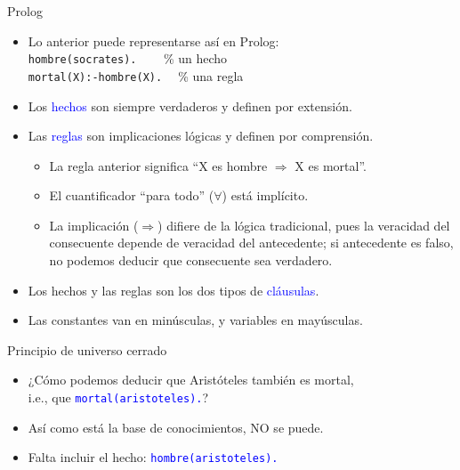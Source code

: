 \documentclass[handout]{beamer} %
\newcommand{\blue}[1]{\textcolor{blue}{#1}}
\begin{document}
\begin{frame}{Prolog}
    \begin{itemize}
        \item<1-> Lo anterior puede representarse así en Prolog:\\[1ex]
    
        \texttt{hombre(socrates). $~~~~~~$} \% un hecho\\
        \texttt{mortal(X):-hombre(X). $~~$} \% una regla
        \item<2-> Los \blue{hechos} son siempre verdaderos y definen por extensión.
        \item<3-> Las \blue{reglas} son implicaciones lógicas y definen por comprensión.
        \begin{itemize}
            \item<4-> La regla anterior significa ``X es hombre $\Rightarrow$ X es mortal''.
            \item<5-> El cuantificador ``para todo'' ($\forall$) está implícito.
            \item<6-> La implicación ($\Rightarrow$) difiere de la lógica tradicional, pues la veracidad del consecuente depende de veracidad del antecedente; si antecedente es falso, no podemos deducir que consecuente sea verdadero.
        \end{itemize}
        \item<7-> Los hechos y las reglas son los dos tipos de \blue{cláusulas}.
        \item<8-> Las constantes van en minúsculas, y variables en mayúsculas.
    \end{itemize}
\end{frame}

\begin{frame}{Principio de universo cerrado}
    \begin{itemize}
        \item<1-> ¿Cómo podemos deducir que Aristóteles también es mortal,\\ i.e., que \blue{\texttt{mortal(aristoteles).}}?
        \item<2-> Así como está la base de conocimientos, NO se puede.
        \item<3-> Falta incluir el hecho: \blue{\texttt{hombre(aristoteles).}}
    \end{itemize}
\end{frame}
\end{document}
